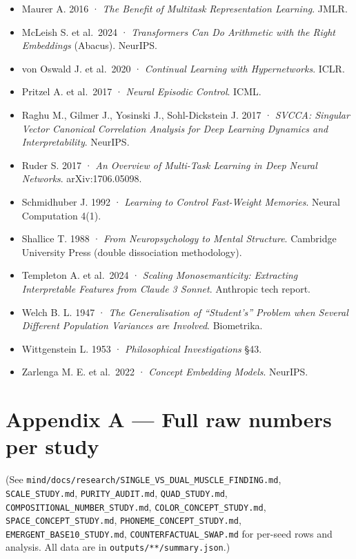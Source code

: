 \begin{itemize}
\item
  Maurer A. 2016 · \emph{The Benefit of Multitask Representation
  Learning}. JMLR.
\item
  McLeish S. et al.~2024 · \emph{Transformers Can Do Arithmetic with the
  Right Embeddings} (Abacus). NeurIPS.
\item
  von Oswald J. et al.~2020 · \emph{Continual Learning with Hypernetworks}.
  ICLR.
\item
  Pritzel A. et al.~2017 · \emph{Neural Episodic Control}. ICML.
\item
  Raghu M., Gilmer J., Yosinski J., Sohl-Dickstein J. 2017 · \emph{SVCCA:
  Singular Vector Canonical Correlation Analysis for Deep Learning
  Dynamics and Interpretability}. NeurIPS.
\item
  Ruder S. 2017 · \emph{An Overview of Multi-Task Learning in Deep Neural
  Networks}. arXiv:1706.05098.
\item
  Schmidhuber J. 1992 · \emph{Learning to Control Fast-Weight Memories}.
  Neural Computation 4(1).
\item
  Shallice T. 1988 · \emph{From Neuropsychology to Mental Structure}.
  Cambridge University Press (double dissociation methodology).
\item
  Templeton A. et al.~2024 · \emph{Scaling Monosemanticity: Extracting
  Interpretable Features from Claude 3 Sonnet}. Anthropic tech
  report.
\item
  Welch B. L. 1947 · \emph{The Generalisation of ``Student's'' Problem when
  Several Different Population Variances are Involved}. Biometrika.
\item
  Wittgenstein L. 1953 · \emph{Philosophical Investigations} §43.
\item
  Zarlenga M. E. et al.~2022 · \emph{Concept Embedding Models}. NeurIPS.
\end{itemize}

\medskip

\section{Appendix A --- Full raw numbers per study}

(See \texttt{mind/docs/research/SINGLE\_VS\_DUAL\_MUSCLE\_FINDING.md}, \texttt{SCALE\_STUDY.md},
\texttt{PURITY\_AUDIT.md}, \texttt{QUAD\_STUDY.md}, \texttt{COMPOSITIONAL\_NUMBER\_STUDY.md},
\texttt{COLOR\_CONCEPT\_STUDY.md}, \texttt{SPACE\_CONCEPT\_STUDY.md},
\texttt{PHONEME\_CONCEPT\_STUDY.md}, \texttt{EMERGENT\_BASE10\_STUDY.md},
\texttt{COUNTERFACTUAL\_SWAP.md} for per-seed rows and analysis. All data are
in \texttt{outputs/**/summary.json}.)

